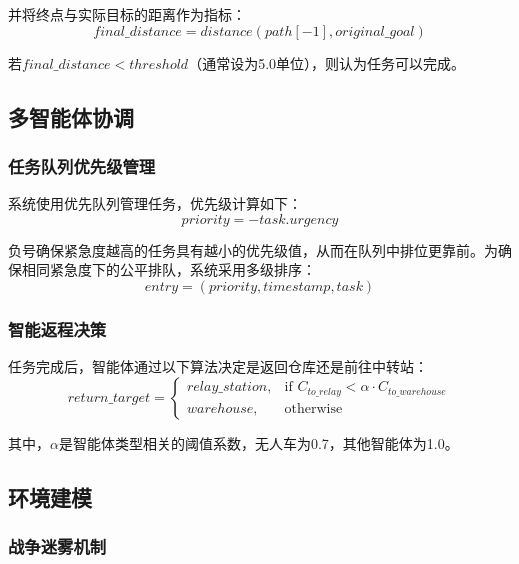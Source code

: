 \documentclass[12pt,a4paper]{article}
\begin{document}
并将终点与实际目标的距离作为指标：
\begin{equation}
final\_distance = distance(path[-1], original\_goal)
\end{equation}

若$final\_distance < threshold$（通常设为5.0单位），则认为任务可以完成。

\subsection{多智能体协调}

\subsubsection{任务队列优先级管理}

系统使用优先队列管理任务，优先级计算如下：
\begin{equation}
priority = -task.urgency
\end{equation}

负号确保紧急度越高的任务具有越小的优先级值，从而在队列中排位更靠前。为确保相同紧急度下的公平排队，系统采用多级排序：
\begin{equation}
entry = (priority, timestamp, task)
\end{equation}

\subsubsection{智能返程决策}

任务完成后，智能体通过以下算法决定是返回仓库还是前往中转站：
\begin{equation}
return\_target = 
\begin{cases}
relay\_station, & \text{if } C_{to\_relay} < \alpha \cdot C_{to\_warehouse} \\
warehouse, & \text{otherwise}
\end{cases}
\end{equation}

其中，$\alpha$是智能体类型相关的阈值系数，无人车为0.7，其他智能体为1.0。

\subsection{环境建模}

\subsubsection{战争迷雾机制}
\end{document}
